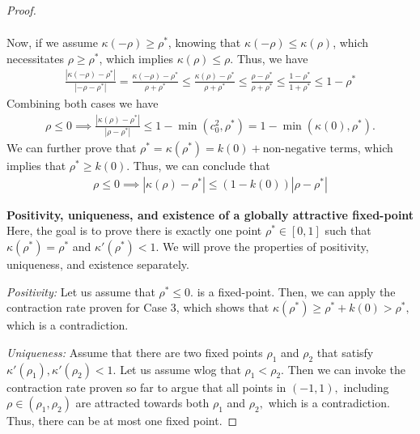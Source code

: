 \begin{proof}
\begin{itemize}
\begin{align*}
\end{align*}
Now, if we assume $\kappa(-\rho) \ge \rho^*$, knowing that $\kappa(-\rho)\le \kappa(\rho)$, which necessitates $\rho\ge \rho^*$, which implies $\kappa(\rho)\le \rho$. Thus, we have
\begin{align*}
\frac{|\kappa(-\rho)-\rho^*|}{|-\rho-\rho^*|} = \frac{\kappa(-\rho)-\rho^*}{\rho+\rho^*}\le \frac{\kappa(\rho)-\rho^*}{\rho+\rho^*} \le \frac{\rho-\rho^*}{\rho+\rho^*} \le \frac{1-\rho^*}{1+\rho^*} \le 1-\rho^*
\end{align*} 
Combining both cases we have 
\begin{align*}
\rho \le 0 \implies \frac{|\kappa(\rho)-\rho^*|}{|\rho-\rho^*|} \le 1 - \min(c_0^2 , \rho^*) = 1-\min(\kappa(0),\rho^*).
\end{align*}
We can further prove that $\rho^* = \kappa(\rho^*) = k(0) + \text{non-negative terms}$, which implies that $\rho^* \ge k(0)$. Thus, we can conclude that 
\begin{align*}
\rho \le 0 \implies |\kappa(\rho)-\rho^*| \le (1 - k(0))|\rho-\rho^*|
\end{align*}
\end{itemize}

\textbf{Positivity, uniqueness, and existence of a globally attractive fixed-point}
Here, the goal is to prove there is exactly one point $\rho^*\in[0,1]$ such that $\kappa(\rho^*) = \rho^*$ and $\kappa'(\rho^*) < 1.$ We will prove the properties of positivity, uniqueness, and existence separately.

\textit{Positivity:} Let us assume that $\rho^* \le 0.$ is a fixed-point. Then, we can apply the contraction rate proven for Case 3, which shows that $\kappa(\rho^*)\ge \rho^* + k(0) > \rho^*,$ which is a contradiction.


\textit{Uniqueness:} Assume that there are two fixed points $\rho_1$ and $\rho_2$ that satisfy $\kappa'(\rho_1),\kappa'(\rho_2)<1.$ Let us assume wlog that $\rho_1 < \rho_2.$ Then we can invoke the contraction rate proven so far to argue that all points in $(-1,1),$ including  $\rho\in (\rho_1,\rho_2)$ are attracted towards both $\rho_1$ and $\rho_2,$ which is a contradiction. Thus, there can be at most one fixed point.


\end{proof}
